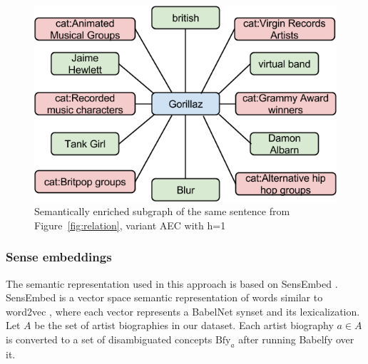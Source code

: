 \begin{figure}[!htp]
\centerline{
\includegraphics[width=0.95\columnwidth]{ch05_similarity/pics/EnrichedGraph1.png}}
\caption{Semantically enriched subgraph of the same sentence from Figure~\ref{fig:relation}, variant AEC with h=1}
\label{fig:enriched}
\end{figure}

%
%

\subsubsection{Sense embeddings}\label{sec:sense_embeddings}
The semantic representation used in this approach is based on SensEmbed \cite{Iacobaccietal2015}. SensEmbed is a vector space semantic representation of words similar to word2vec \cite{Mikolovetal2013},
where each vector represents a BabelNet synset and its lexicalization. Let $A$ be the set of artist biographies in our dataset. Each artist biography $a \in A$ is converted to a set of disambiguated concepts $\text{Bfy}_{a}$ after running Babelfy over it.


